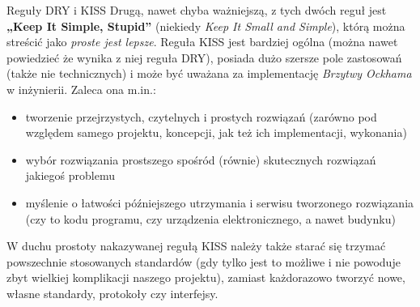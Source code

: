 \begin{ProTip}[breakable]{Reguły DRY i KISS}
Drugą, nawet chyba ważniejszą, z tych dwóch reguł jest \textbf{„Keep It Simple, Stupid”} (niekiedy \textit{Keep It Small and Simple}), którą można streścić jako \textit{proste jest lepsze}.
Reguła KISS jest bardziej ogólna (można nawet powiedzieć że wynika z niej reguła DRY), posiada dużo szersze pole zastosowań (także nie technicznych) i może być uważana za implementację \textit{Brzytwy Ockhama} w inżynierii.
Zaleca ona m.in.:
\begin{itemize}
\item tworzenie przejrzystych, czytelnych i prostych rozwiązań (zarówno pod względem samego projektu, koncepcji, jak też ich implementacji, wykonania)
\item wybór rozwiązania prostszego spośród (równie) skutecznych rozwiązań jakiegoś problemu
\item myślenie o łatwości późniejszego utrzymania i serwisu tworzonego rozwiązania (czy to kodu programu, czy urządzenia elektronicznego, a nawet budynku)
\end{itemize}

W duchu prostoty nakazywanej regułą KISS należy także starać się trzymać powszechnie stosowanych standardów
(gdy tylko jest to możliwe i nie powoduje zbyt wielkiej komplikacji naszego projektu),
zamiast każdorazowo tworzyć nowe, własne standardy, protokoły czy interfejsy.
\end{ProTip}
